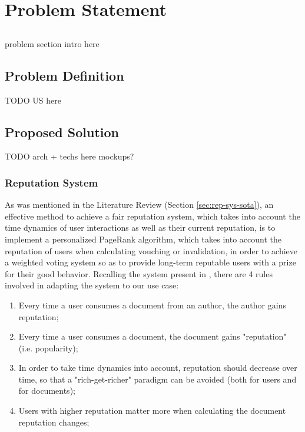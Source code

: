 \chapter{Problem Statement}\label{chap:problem}

\section*{}

problem section intro here

\section{Problem Definition}

TODO
US here

\section{Proposed Solution} \label{sec:problem-solution-proposal}

TODO
arch + techs here
mockups?
\subsection{Reputation System} \label{sec:problem-solution-proposal-rep-system}
As was mentioned in the Literature Review (Section \ref{sec:rep-sys-sota}), an effective method to achieve a fair reputation system, which takes into account the time dynamics of user interactions as well as their current reputation, is to implement a personalized PageRank algorithm, which takes into account the reputation of users when calculating vouching or invalidation, in order to achieve a weighted voting system so as to provide long-term reputable users with a prize for their good behavior. Recalling the system present in \cite{Daly2009}, there are 4 rules involved in adapting the system to our use case:

\begin{enumerate}
    \item Every time a user consumes a document from an author, the author gains reputation;
    \item Every time a user consumes a document, the document gains "reputation" (i.e. popularity);
    \item In order to take time dynamics into account, reputation should decrease over time, so that a "rich-get-richer" paradigm can be avoided (both for users and for documents);
    \item Users with higher reputation matter more when calculating the document reputation changes;
\end{enumerate}

